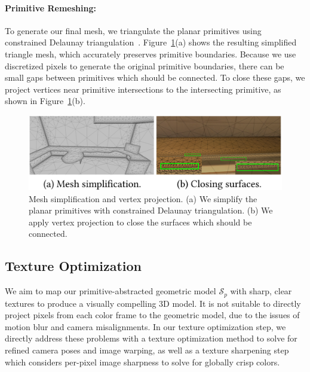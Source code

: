 \paragraph*{Primitive Remeshing:}
To generate our final mesh, we triangulate the planar primitives using constrained Delaunay triangulation~\cite{chew1987constrained}. 
Figure~\ref{fig:3dlite-remesh}(a) shows the resulting simplified triangle mesh, which accurately preserves primitive boundaries.
Because we use discretized pixels to generate the original primitive boundaries, there can be small gaps between primitives which should be connected. 
To close these gaps, we project vertices near primitive intersections to the intersecting primitive, as shown in Figure~\ref{fig:3dlite-remesh}(b).
\begin{figure}
\centering
\includegraphics[width=0.8\linewidth]{3dlite/fig12.png}
\caption{Mesh simplification and vertex projection. (a) We simplify the planar primitives with constrained Delaunay triangulation. (b) We apply vertex projection to close the surfaces which should be connected.}
\label{fig:3dlite-remesh}
\end{figure}

\subsection{Texture Optimization}
\label{sec:approach-texture}

We aim to map our primitive-abstracted geometric model $\mathcal{S}_p$ with sharp, clear textures to produce a visually compelling 3D model.
It is not suitable to directly project pixels from each color frame to the geometric model, due to the issues of motion blur and camera misalignments.
In our texture optimization step, we directly address these problems with a texture optimization method to solve for refined camera poses and image warping, as well as a texture sharpening step which considers per-pixel image sharpness to solve for globally crisp colors.

